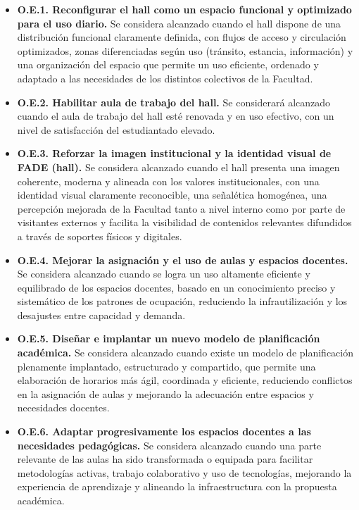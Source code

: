 \documentclass[11pt,a4paper]{scrreprt}
\begin{document}
\begin{itemize}

\item \textbf{O.E.1. Reconfigurar el hall como un espacio funcional y optimizado para el uso diario.}  
Se considera alcanzado cuando el hall dispone de una distribución funcional claramente definida, con flujos de acceso y circulación optimizados, zonas diferenciadas según uso (tránsito, estancia, información) y una organización del espacio que permite un uso eficiente, ordenado y adaptado a las necesidades de los distintos colectivos de la Facultad.

\item \textbf{O.E.2. Habilitar aula de trabajo del hall.}
Se considerará alcanzado cuando el aula de trabajo del hall esté renovada y en uso efectivo, con un nivel de satisfacción del estudiantado elevado.

\item \textbf{O.E.3. Reforzar la imagen institucional y la identidad visual de FADE (hall).}  
Se considera alcanzado cuando el hall presenta una imagen coherente, moderna y alineada con los valores institucionales, con una identidad visual claramente reconocible, una señalética homogénea, una percepción mejorada de la Facultad tanto a nivel interno como por parte de visitantes externos y facilita la visibilidad de contenidos relevantes difundidos a través de soportes físicos y digitales.

\item \textbf{O.E.4. Mejorar la asignación y el uso de aulas y espacios docentes.}  
Se considera alcanzado cuando se logra un uso altamente eficiente y equilibrado de los espacios docentes, basado en un conocimiento preciso y sistemático de los patrones de ocupación, reduciendo la infrautilización y los desajustes entre capacidad y demanda.

\item \textbf{O.E.5. Diseñar e implantar un nuevo modelo de planificación académica.}  
Se considera alcanzado cuando existe un modelo de planificación plenamente implantado, estructurado y compartido, que permite una elaboración de horarios más ágil, coordinada y eficiente, reduciendo conflictos en la asignación de aulas y mejorando la adecuación entre espacios y necesidades docentes.

\item \textbf{O.E.6. Adaptar progresivamente los espacios docentes a las necesidades pedagógicas.}  
Se considera alcanzado cuando una parte relevante de las aulas ha sido transformada o equipada para facilitar metodologías activas, trabajo colaborativo y uso de tecnologías, mejorando la experiencia de aprendizaje y alineando la infraestructura con la propuesta académica.


\end{itemize}
\end{document}
